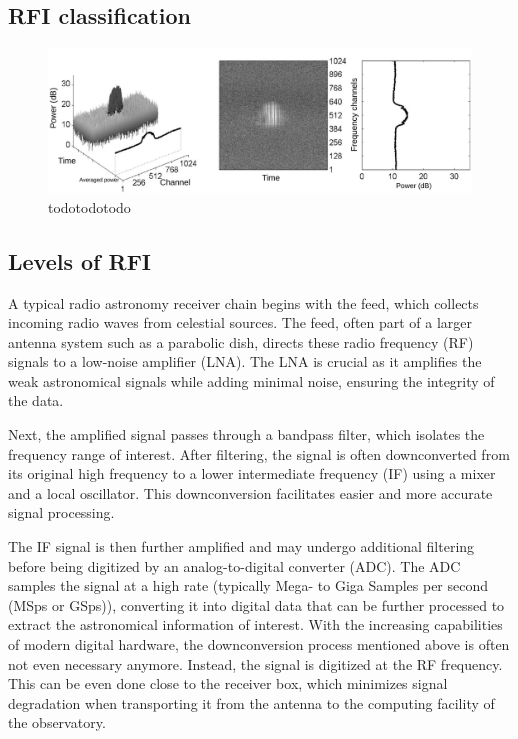 \subsection{RFI classification}
\label{subsection:hardware:introduction: classification}

\begin{figure}
    \centering
    \includegraphics[height=.20\textheight]{figures/radar.pdf}
    \caption{todotodotodo}
    \label{fig:rfi_example_radar}
\end{figure}

\subsection{Levels of RFI}
\label{subsection:hardware:introduction: levels}
A typical radio astronomy receiver chain begins with the feed, which collects incoming radio waves from celestial sources. The feed, often part of a larger antenna system such as a parabolic dish, directs these radio frequency (RF) signals to a low-noise amplifier (LNA). The LNA is crucial as it amplifies the weak astronomical signals while adding minimal noise, ensuring the integrity of the data.

Next, the amplified signal passes through a bandpass filter, which isolates the frequency range of interest. After filtering, the signal is often downconverted from its original high frequency to a lower intermediate frequency (IF) using a mixer and a local oscillator. This downconversion facilitates easier and more accurate signal processing.

The IF signal is then further amplified and may undergo additional filtering before being digitized by an analog-to-digital converter (ADC). The ADC samples the signal at a high rate (typically Mega- to Giga Samples per second (MSps or GSps)), converting it into digital data that can be further processed to extract the astronomical information of interest. With the increasing capabilities of modern digital hardware, the downconversion process mentioned above is often not even necessary anymore. Instead, the signal is digitized at the RF frequency. This can be even done close to the receiver box, which minimizes signal degradation when transporting it from the antenna to the computing facility of the observatory.

